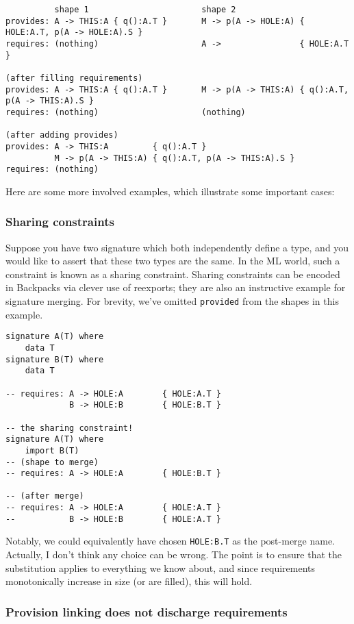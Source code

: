 \documentclass{article}
\newcommand{\Red}[1]{{\color{red} #1}}
\begin{document}
\begin{verbatim}
          shape 1                       shape 2
provides: A -> THIS:A { q():A.T }       M -> p(A -> HOLE:A) { HOLE:A.T, p(A -> HOLE:A).S }
requires: (nothing)                     A ->                { HOLE:A.T }

(after filling requirements)
provides: A -> THIS:A { q():A.T }       M -> p(A -> THIS:A) { q():A.T, p(A -> THIS:A).S }
requires: (nothing)                     (nothing)

(after adding provides)
provides: A -> THIS:A         { q():A.T }
          M -> p(A -> THIS:A) { q():A.T, p(A -> THIS:A).S }
requires: (nothing)
\end{verbatim}

Here are some more involved examples, which illustrate some important
cases:

\subsubsection{Sharing constraints}

Suppose you have two signature which both independently define a type,
and you would like to assert that these two types are the same.  In the
ML world, such a constraint is known as a sharing constraint.  Sharing
constraints can be encoded in Backpacks via clever use of reexports;
they are also an instructive example for signature merging.
For brevity, we've omitted \verb|provided| from the shapes in this example.

\begin{verbatim}
signature A(T) where
    data T
signature B(T) where
    data T

-- requires: A -> HOLE:A        { HOLE:A.T }
             B -> HOLE:B        { HOLE:B.T }

-- the sharing constraint!
signature A(T) where
    import B(T)
-- (shape to merge)
-- requires: A -> HOLE:A        { HOLE:B.T }

-- (after merge)
-- requires: A -> HOLE:A        { HOLE:A.T }
--           B -> HOLE:B        { HOLE:A.T }
\end{verbatim}

Notably, we could equivalently have chosen \verb|HOLE:B.T| as the post-merge
name.  \Red{Actually, I don't think any choice can be wrong. The point is to
ensure that the substitution applies to everything we know about, and since requirements
monotonically increase in size (or are filled), this will hold.}

\subsubsection{Provision linking does not discharge requirements}
\end{document}
